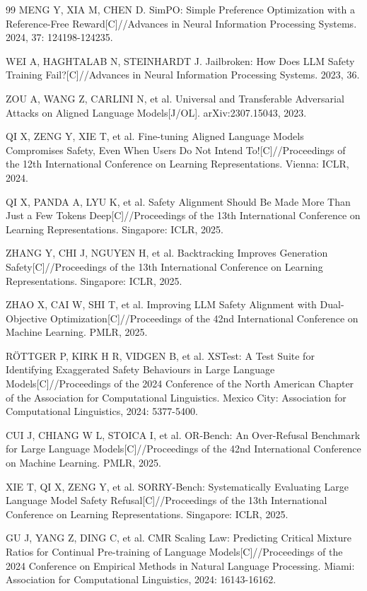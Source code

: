 \documentclass[fontset=fandol,type=master,campus=shenzhen,etitleauto=true]{hithesisbook}
\begin{document}
\begin{thebibliography}{99}
 MENG Y, XIA M, CHEN D. SimPO: Simple Preference Optimization with a Reference-Free Reward[C]//Advances in Neural Information Processing Systems. 2024, 37: 124198-124235.

 WEI A, HAGHTALAB N, STEINHARDT J. Jailbroken: How Does LLM Safety Training Fail?[C]//Advances in Neural Information Processing Systems. 2023, 36.

 ZOU A, WANG Z, CARLINI N, et al. Universal and Transferable Adversarial Attacks on Aligned Language Models[J/OL]. arXiv:2307.15043, 2023.

 QI X, ZENG Y, XIE T, et al. Fine-tuning Aligned Language Models Compromises Safety, Even When Users Do Not Intend To![C]//Proceedings of the 12th International Conference on Learning Representations. Vienna: ICLR, 2024.

 QI X, PANDA A, LYU K, et al. Safety Alignment Should Be Made More Than Just a Few Tokens Deep[C]//Proceedings of the 13th International Conference on Learning Representations. Singapore: ICLR, 2025.

 ZHANG Y, CHI J, NGUYEN H, et al. Backtracking Improves Generation Safety[C]//Proceedings of the 13th International Conference on Learning Representations. Singapore: ICLR, 2025.

 ZHAO X, CAI W, SHI T, et al. Improving LLM Safety Alignment with Dual-Objective Optimization[C]//Proceedings of the 42nd International Conference on Machine Learning. PMLR, 2025.

 RÖTTGER P, KIRK H R, VIDGEN B, et al. XSTest: A Test Suite for Identifying Exaggerated Safety Behaviours in Large Language Models[C]//Proceedings of the 2024 Conference of the North American Chapter of the Association for Computational Linguistics. Mexico City: Association for Computational Linguistics, 2024: 5377-5400.

 CUI J, CHIANG W L, STOICA I, et al. OR-Bench: An Over-Refusal Benchmark for Large Language Models[C]//Proceedings of the 42nd International Conference on Machine Learning. PMLR, 2025.

 XIE T, QI X, ZENG Y, et al. SORRY-Bench: Systematically Evaluating Large Language Model Safety Refusal[C]//Proceedings of the 13th International Conference on Learning Representations. Singapore: ICLR, 2025.

 GU J, YANG Z, DING C, et al. CMR Scaling Law: Predicting Critical Mixture Ratios for Continual Pre-training of Language Models[C]//Proceedings of the 2024 Conference on Empirical Methods in Natural Language Processing. Miami: Association for Computational Linguistics, 2024: 16143-16162.


\end{thebibliography}
\end{document}
